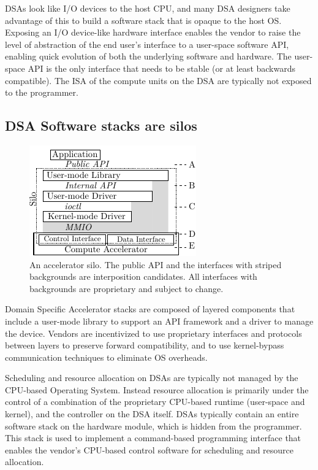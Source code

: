 DSAs look like I/O devices to the host CPU, and many DSA designers take
advantage of this to build a software stack that is opaque to the host OS.
Exposing an I/O device-like hardware interface enables the vendor to raise the
level of abstraction of the end user's interface to a user-space software API,
enabling quick evolution of both the underlying software and hardware. The
user-space API is the only interface that needs to be stable (or at least
backwards compatible). The ISA of the compute units on the DSA are typically
not exposed to the programmer.

\subsection{DSA Software stacks are silos}
\begin{figure}[!h]
	\centering
	\includegraphics[width=.5\linewidth]{figures/silo.pdf}
	\caption{An accelerator silo. The public API and the interfaces with striped backgrounds are interposition candidates. All interfaces with backgrounds are proprietary and subject to change.}
	\label{fig:silo}
\end{figure}

Domain Specific Accelerator stacks are composed of layered components that
include a user-mode library to support an API framework and a driver to manage
the device. Vendors are incentivized to use proprietary interfaces and
protocols between layers to preserve forward compatibility, and to use
kernel-bypass communication techniques to eliminate OS overheads.

Scheduling and resource allocation on DSAs are typically not managed by the
CPU-based Operating System. Instead resource allocation is primarily under the
control of a combination of the proprietary CPU-based runtime (user-space and
kernel), and the controller on the DSA itself. DSAs typically contain an
entire software stack on the hardware module, which is hidden from the
programmer. This stack is used to implement a command-based programming
interface that enables the vendor's CPU-based control software for scheduling
and resource allocation.

